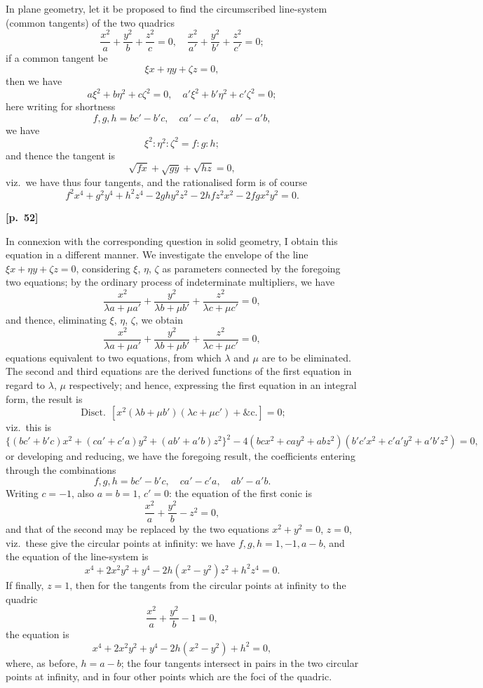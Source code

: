 \documentclass[11pt,a4paper]{article}
\theoremstyle{plain}
\DeclareMathOperator{\Disc}{Disct.}
\begin{document}
In plane geometry, let it be proposed to find the circumscribed line-system (common tangents) of the two quadrics
$$
\frac{x^2}{a} + \frac{y^2}{b} + \frac{z^2}{c} = 0, \quad \frac{x^2}{a'} + \frac{y^2}{b'} + \frac{z^2}{c'} = 0;
$$
if a common tangent be
$$
\xi x + \eta y + \zeta z = 0,
$$
then we have
$$
a\xi^2 + b\eta^2 + c\zeta^2 = 0, \quad a'\xi^2 + b'\eta^2 + c'\zeta^2 = 0;
$$
here writing for shortness
$$
f, g, h = bc' - b'c, \quad ca' - c'a, \quad ab' - a'b,
$$
we have
$$
\xi^2 : \eta^2 : \zeta^2 = f : g : h;
$$
and thence the tangent is
$$
\sqrt{fx} + \sqrt{gy} + \sqrt{hz} = 0,
$$
viz.\ we have thus four tangents, and the rationalised form is of course
$$
f^2 x^4 + g^2 y^4 + h^2 z^4 - 2ghy^2 z^2 - 2hfz^2 x^2 - 2fgx^2 y^2 = 0.
$$

\vspace{0.5em}
\noindent\textbf{[p.\ 52]}

In connexion with the corresponding question in solid geometry, I obtain this equation in a different manner. We investigate the envelope of the line $\xi x + \eta y + \zeta z = 0$, considering $\xi$, $\eta$, $\zeta$ as parameters connected by the foregoing two equations; by the ordinary process of indeterminate multipliers, we have
$$
\frac{x^2}{\lambda a + \mu a'} + \frac{y^2}{\lambda b + \mu b'} + \frac{z^2}{\lambda c + \mu c'} = 0,
$$
and thence, eliminating $\xi$, $\eta$, $\zeta$, we obtain
$$
\frac{x^2}{\lambda a + \mu a'} + \frac{y^2}{\lambda b + \mu b'} + \frac{z^2}{\lambda c + \mu c'} = 0,
$$
equations equivalent to two equations, from which $\lambda$ and $\mu$ are to be eliminated. The second and third equations are the derived functions of the first equation in regard to $\lambda$, $\mu$ respectively; and hence, expressing the first equation in an integral form, the result is
$$
\Disc\, [x^2(\lambda b + \mu b')(\lambda c + \mu c') + \text{\&c.}] = 0;
$$
viz.\ this is
$$
\{(bc' + b'c)x^2 + (ca' + c'a)y^2 + (ab' + a'b)z^2\}^2 - 4(bcx^2 + cay^2 + abz^2)(b'c'x^2 + c'a'y^2 + a'b'z^2) = 0,
$$
or developing and reducing, we have the foregoing result, the coefficients entering through the combinations
$$
f, g, h = bc' - b'c, \quad ca' - c'a, \quad ab' - a'b.
$$
Writing $c = -1$, also $a = b = 1$, $c' = 0$: the equation of the first conic is
$$
\frac{x^2}{a} + \frac{y^2}{b} - z^2 = 0,
$$
and that of the second may be replaced by the two equations $x^2 + y^2 = 0$, $z = 0$, viz.\ these give the circular points at infinity: we have $f, g, h = 1, -1, a - b$, and the equation of the line-system is
$$
x^4 + 2x^2 y^2 + y^4 - 2h(x^2 - y^2)z^2 + h^2 z^4 = 0.
$$
If finally, $z = 1$, then for the tangents from the circular points at infinity to the quadric
$$
\frac{x^2}{a} + \frac{y^2}{b} - 1 = 0,
$$
the equation is
$$
x^4 + 2x^2 y^2 + y^4 - 2h(x^2 - y^2) + h^2 = 0,
$$
where, as before, $h = a - b$; the four tangents intersect in pairs in the two circular points at infinity, and in four other points which are the foci of the quadric.
\end{document}
